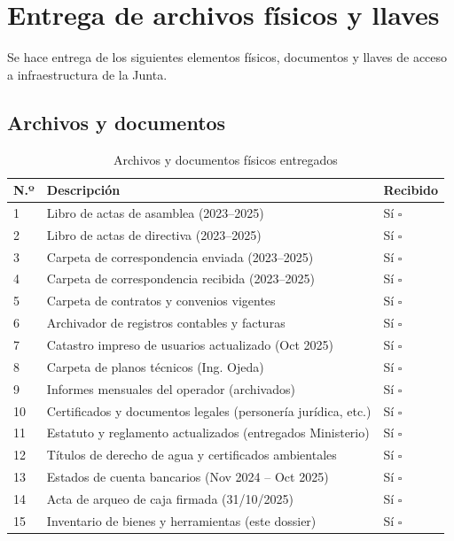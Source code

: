 \section{Entrega de archivos físicos y llaves}

Se hace entrega de los siguientes elementos físicos, documentos y llaves de acceso a infraestructura de la Junta.

\subsection*{Archivos y documentos}

\begin{table}[H]
\centering
\caption{Archivos y documentos físicos entregados}
\label{tab:archivos-entregados}
\begin{tabularx}{\textwidth}{@{}lXl@{}}
\toprule
\textbf{N.º} & \textbf{Descripción} & \textbf{Recibido} \\
\midrule
1 & Libro de actas de asamblea (2023--2025) & Sí $\square$ \\
2 & Libro de actas de directiva (2023--2025) & Sí $\square$ \\
3 & Carpeta de correspondencia enviada (2023--2025) & Sí $\square$ \\
4 & Carpeta de correspondencia recibida (2023--2025) & Sí $\square$ \\
5 & Carpeta de contratos y convenios vigentes & Sí $\square$ \\
6 & Archivador de registros contables y facturas & Sí $\square$ \\
7 & Catastro impreso de usuarios actualizado (Oct 2025) & Sí $\square$ \\
8 & Carpeta de planos técnicos (Ing. Ojeda) & Sí $\square$ \\
9 & Informes mensuales del operador (archivados) & Sí $\square$ \\
10 & Certificados y documentos legales (personería jurídica, etc.) & Sí $\square$ \\
11 & Estatuto y reglamento actualizados (entregados Ministerio) & Sí $\square$ \\
12 & Títulos de derecho de agua y certificados ambientales & Sí $\square$ \\
13 & Estados de cuenta bancarios (Nov 2024 -- Oct 2025) & Sí $\square$ \\
14 & Acta de arqueo de caja firmada (31/10/2025) & Sí $\square$ \\
15 & Inventario de bienes y herramientas (este dossier) & Sí $\square$ \\
\bottomrule
\end{tabularx}
\end{table}

